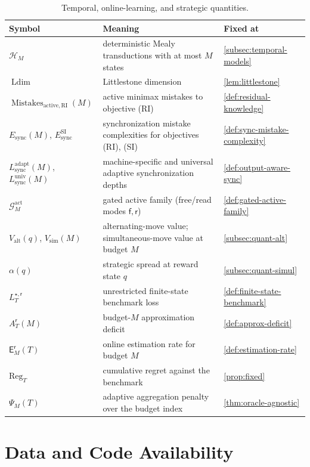 \documentclass[12pt]{article}
\theoremstyle{definition}
\DeclareMathOperator{\Ldim}{Ldim}
\newcommand{\Reg}{\mathrm{Reg}}
\newcommand{\Est}{\mathsf E}
\newcommand{\Aapp}{A_T}
\newcommand{\PsiAgg}{\Psi}
\newcommand{\Lsync}{L_{\mathrm{sync}}^{\mathrm{adapt}}}
\newcommand{\Lsyncu}{L_{\mathrm{sync}}^{\mathrm{univ}}}
\newcommand{\Esync}{E_{\mathrm{sync}}}
\newcommand{\EsyncSI}{E_{\mathrm{sync}}^{\mathrm{SI}}}
\newcommand{\MistRI}{\operatorname{Mistakes}_{\mathrm{active,RI}}}
\newcommand{\Valt}{V_{\mathrm{alt}}}
\newcommand{\Vsim}{V_{\mathrm{sim}}}
\newcommand{\Gact}{\mathcal G^{\mathrm{act}}}
\newcommand{\free}{\mathsf f}
\newcommand{\rd}{\mathsf r}
\begin{document}
\begin{table}[htbp]
\centering
\small
\caption{Temporal, online-learning, and strategic quantities.}
\label{tab:notation-temporal}
\begin{tabular}{@{}p{3.5cm}p{7.7cm}p{2.8cm}@{}}
\toprule
\textbf{Symbol} & \textbf{Meaning} & \textbf{Fixed at} \\
\midrule
$\mathcal H_M$ & deterministic Mealy transductions with at most $M$ states &
\ref{subsec:temporal-models} \\[2pt]
$\Ldim$ & Littlestone dimension & \ref{lem:littlestone} \\[2pt]
$\MistRI(M)$ & active minimax mistakes to objective (RI) &
\ref{def:residual-knowledge} \\[2pt]
$\Esync(M)$, $\EsyncSI$ & synchronization mistake complexities for
objectives (RI), (SI) & \ref{def:sync-mistake-complexity} \\[2pt]
$\Lsync(M)$, $\Lsyncu(M)$ & machine-specific and universal adaptive
synchronization depths & \ref{def:output-aware-sync} \\[2pt]
$\Gact_M$ & gated active family (free/read modes $\free,\rd$) &
\ref{def:gated-active-family} \\[2pt]
$\Valt(q)$, $\Vsim(M)$ & alternating-move value; simultaneous-move value at
budget $M$ & \ref{subsec:quant-alt} \\[2pt]
$\alpha(q)$ & strategic spread at reward state $q$ &
\ref{subsec:quant-simul} \\[2pt]
$L_T^{\star,\mathsf r}$ & unrestricted finite-state benchmark loss &
\ref{def:finite-state-benchmark} \\[2pt]
$\Aapp^{\mathsf r}(M)$ & budget-$M$ approximation deficit &
\ref{def:approx-deficit} \\[2pt]
$\Est_M^{\mathsf r}(T)$ & online estimation rate for budget $M$ &
\ref{def:estimation-rate} \\[2pt]
$\Reg_T$ & cumulative regret against the benchmark &
\ref{prop:fixed} \\[2pt]
$\PsiAgg_M(T)$ & adaptive aggregation penalty over the budget index &
\ref{thm:oracle-agnostic} \\
\bottomrule
\end{tabular}
\end{table}

\section*{Data and Code Availability}
\end{document}
